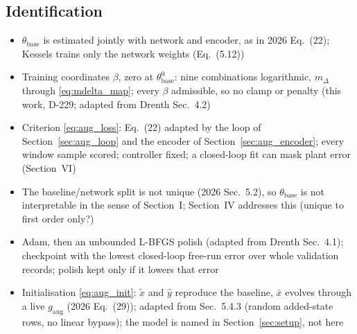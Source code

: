 \subsection{Identification}\label{sec:aug_closed_loop}
\ifdraft
\begin{itemize}
\item $\theta_{\mathrm{base}}$ is estimated jointly with network and encoder, as in 2026 Eq.~(22); Kessels trains only the network weights (Eq.~(5.12))
\item Training coordinates $\beta$, zero at $\theta^0_{\mathrm{base}}$: nine combinations logarithmic, $m_\Delta$ through \eqref{eq:mdelta_map}; every $\beta$ admissible, so no clamp or penalty (this work, D-229; adapted from Drenth Sec.~4.2)
\item Criterion \eqref{eq:aug_loss}: Eq.~(22) adapted by the loop of Section~\ref{sec:aug_loop} and the encoder of Section~\ref{sec:aug_encoder}; every window sample scored; controller fixed; a closed-loop fit can mask plant error (Section~VI)
\item The baseline/network split is not unique (2026 Sec.~5.2), so $\theta_{\mathrm{base}}$ is not interpretable in the sense of Section~I; Section~IV addresses this (unique to first order only?)
\item Adam, then an unbounded L-BFGS polish (adapted from Drenth Sec.~4.1); checkpoint with the lowest closed-loop free-run error over whole validation records; polish kept only if it lowers that error
\item Initialisation \eqref{eq:aug_init}: $\tilde x$ and $\hat y$ reproduce the baseline, $\bar x$ evolves through a live $g_{\mathrm{aug}}$ (2026 Eq.~(29)); adapted from Sec.~5.4.3 (random added-state rows, no linear bypass); the model is named in Section~\ref{sec:setup}, not here
\end{itemize}
\fi

